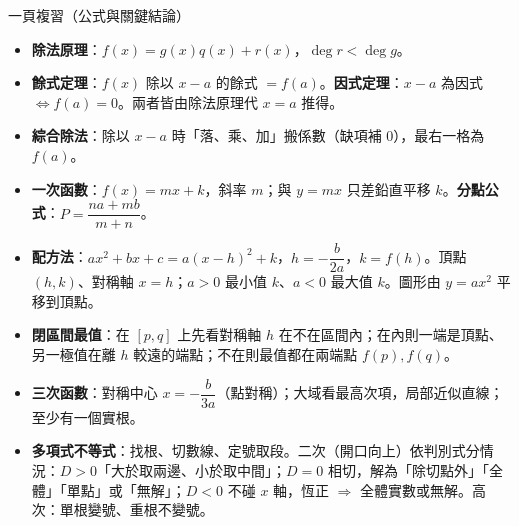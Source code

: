 \documentclass[11pt]{article}
\begin{document}
\begin{補充框}{一頁複習（公式與關鍵結論）}
\begin{itemize}\setlength{\itemsep}{2pt}
\item \textbf{除法原理}：$f(x)=g(x)q(x)+r(x)$，$\deg r<\deg g$。
\item \textbf{餘式定理}：$f(x)$ 除以 $x-a$ 的餘式 $=f(a)$。\textbf{因式定理}：$x-a$ 為因式 $\iff f(a)=0$。兩者皆由除法原理代 $x=a$ 推得。
\item \textbf{綜合除法}：除以 $x-a$ 時「落、乘、加」搬係數（缺項補 $0$），最右一格為 $f(a)$。
\item \textbf{一次函數}：$f(x)=mx+k$，斜率 $m$；與 $y=mx$ 只差鉛直平移 $k$。\textbf{分點公式}：$P=\dfrac{na+mb}{m+n}$。
\item \textbf{配方法}：$ax^2+bx+c=a(x-h)^2+k$，$h=-\dfrac{b}{2a}$，$k=f(h)$。頂點 $(h,k)$、對稱軸 $x=h$；$a>0$ 最小值 $k$、$a<0$ 最大值 $k$。圖形由 $y=ax^2$ 平移到頂點。
\item \textbf{閉區間最值}：在 $[p,q]$ 上先看對稱軸 $h$ 在不在區間內；在內則一端是頂點、另一極值在離 $h$ 較遠的端點；不在則最值都在兩端點 $f(p),f(q)$。
\item \textbf{三次函數}：對稱中心 $x=-\dfrac{b}{3a}$（點對稱）；大域看最高次項，局部近似直線；至少有一個實根。
\item \textbf{多項式不等式}：找根、切數線、定號取段。二次（開口向上）依判別式分情況：$D>0$「大於取兩邊、小於取中間」；$D=0$ 相切，解為「除切點外」「全體」「單點」或「無解」；$D<0$ 不碰 $x$ 軸，恆正 $\Rightarrow$ 全體實數或無解。高次：單根變號、重根不變號。
\end{itemize}
\end{補充框}
\end{document}
